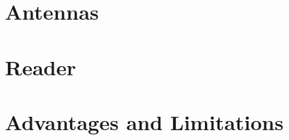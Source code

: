 






\section{Antennas} \label{sec:antenna}


\section{Reader} \label{sec:reader}


\section{Advantages and Limitations}












\cleardoublepage